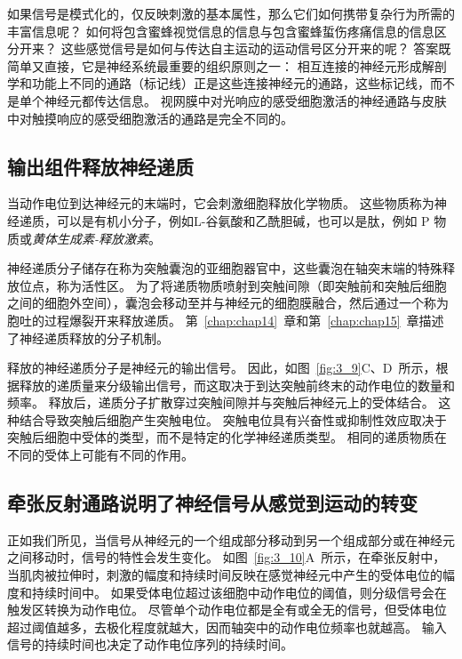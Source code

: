 如果信号是模式化的，仅反映刺激的基本属性，那么它们如何携带复杂行为所需的丰富信息呢？
如何将包含蜜蜂视觉信息的信息与包含蜜蜂蜇伤疼痛信息的信息区分开来？
这些感觉信号是如何与传达自主运动的运动信号区分开来的呢？
答案既简单又直接，它是神经系统最重要的组织原则之一：
相互连接的神经元形成解剖学和功能上不同的通路（标记线）正是这些连接神经元的通路，这些标记线，而不是单个神经元都传达信息。 
视网膜中对光响应的感受细胞激活的神经通路与皮肤中对触摸响应的感受细胞激活的通路是完全不同的。


\subsection{输出组件释放神经递质}

当动作电位到达神经元的末端时，它会刺激细胞释放化学物质。
这些物质称为神经递质，可以是有机小分子，例如L-谷氨酸和乙酰胆碱，也可以是肽，例如 P 物质或\textit{黄体生成素-释放激素}。


神经递质分子储存在称为突触囊泡的亚细胞器官中，这些囊泡在轴突末端的特殊释放位点，称为活性区。
为了将递质物质喷射到突触间隙（即突触前和突触后细胞之间的细胞外空间），囊泡会移动至并与神经元的细胞膜融合，然后通过一个称为胞吐的过程爆裂开来释放递质。
第~\ref{chap:chap14}~章和第~\ref{chap:chap15}~章描述了神经递质释放的分子机制。


释放的神经递质分子是神经元的输出信号。 
因此，如图~\ref{fig:3_9}C、D~所示，根据释放的递质量来分级输出信号，而这取决于到达突触前终末的动作电位的数量和频率。
释放后，递质分子扩散穿过突触间隙并与突触后神经元上的受体结合。
这种结合导致突触后细胞产生突触电位。
突触电位具有兴奋性或抑制性效应取决于突触后细胞中受体的类型，而不是特定的化学神经递质类型。
相同的递质物质在不同的受体上可能有不同的作用。



\subsection{牵张反射通路说明了神经信号从感觉到运动的转变}

正如我们所见，当信号从神经元的一个组成部分移动到另一个组成部分或在神经元之间移动时，信号的特性会发生变化。
如图~\ref{fig:3_10}A~所示，在牵张反射中，当肌肉被拉伸时，刺激的幅度和持续时间反映在感觉神经元中产生的受体电位的幅度和持续时间中。
如果受体电位超过该细胞中动作电位的阈值，则分级信号会在触发区转换为动作电位。
尽管单个动作电位都是全有或全无的信号，但受体电位超过阈值越多，去极化程度就越大，因而轴突中的动作电位频率也就越高。
输入信号的持续时间也决定了动作电位序列的持续时间。


